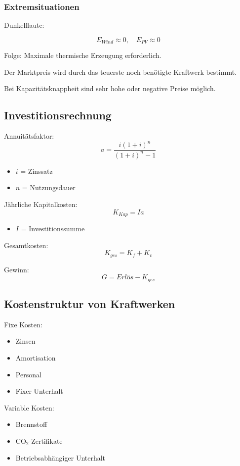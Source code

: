 \subsubsection{Extremsituationen}

Dunkelflaute:

\[
E_{Wind} \approx 0, \quad E_{PV} \approx 0
\]

Folge:
Maximale thermische Erzeugung erforderlich.

Der Marktpreis wird durch das teuerste noch benötigte
Kraftwerk bestimmt.

Bei Kapazitätsknappheit sind sehr hohe oder negative
Preise möglich.

\subsection{Investitionsrechnung}

Annuitätsfaktor:
\[
a = \frac{i(1+i)^n}{(1+i)^n - 1}
\]

\begin{itemize}
\item $i$ = Zinssatz
\item $n$ = Nutzungsdauer
\end{itemize}

Jährliche Kapitalkosten:
\[
K_{Kap} = I a
\]

\begin{itemize}
\item $I$ = Investitionssumme
\end{itemize}

Gesamtkosten:
\[
K_{ges} = K_f + K_v
\]

Gewinn:
\[
G = Erlös - K_{ges}
\]

\subsection{Kostenstruktur von Kraftwerken}

Fixe Kosten:

\begin{itemize}
\item Zinsen
\item Amortisation
\item Personal
\item Fixer Unterhalt
\end{itemize}

Variable Kosten:

\begin{itemize}
\item Brennstoff
\item CO$_2$-Zertifikate
\item Betriebsabhängiger Unterhalt
\end{itemize}


